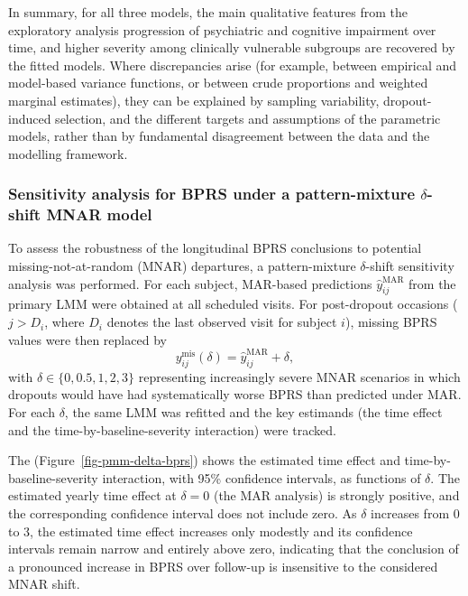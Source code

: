 \documentclass[
  9pt,
  letterpaper,
  DIV=11,
  numbers=noendperiod]{scrartcl}
\begin{document}
In summary, for all three models, the main qualitative features from the
exploratory analysis progression of psychiatric and cognitive impairment
over time, and higher severity among clinically vulnerable subgroups are
recovered by the fitted models. Where discrepancies arise (for example,
between empirical and model-based variance functions, or between crude
proportions and weighted marginal estimates), they can be explained by
sampling variability, dropout-induced selection, and the different
targets and assumptions of the parametric models, rather than by
fundamental disagreement between the data and the modelling framework.

\subsubsection{\texorpdfstring{Sensitivity analysis for BPRS under a
pattern-mixture \(\delta\)-shift MNAR
model}{Sensitivity analysis for BPRS under a pattern-mixture \textbackslash delta-shift MNAR model}}\label{sensitivity-analysis-for-bprs-under-a-pattern-mixture-delta-shift-mnar-model}

To assess the robustness of the longitudinal BPRS conclusions to
potential missing-not-at-random (MNAR) departures, a pattern-mixture
\(\delta\)-shift sensitivity analysis was performed. For each subject,
MAR-based predictions \(\widehat{y}^{\text{MAR}}_{ij}\) from the primary
LMM were obtained at all scheduled visits. For post-dropout occasions
(\(j > D_i\), where \(D_i\) denotes the last observed visit for subject
\(i\)), missing BPRS values were then replaced by \[
y^{\text{mis}}_{ij}(\delta) = \widehat{y}^{\text{MAR}}_{ij} + \delta,
\] with \(\delta \in \{0, 0.5, 1, 2, 3\}\) representing increasingly
severe MNAR scenarios in which dropouts would have had systematically
worse BPRS than predicted under MAR. For each \(\delta\), the same LMM
was refitted and the key estimands (the time effect and the
time-by-baseline-severity interaction) were tracked.

The (Figure~\ref{fig-pmm-delta-bprs}) shows the estimated time effect
and time-by-baseline-severity interaction, with 95\% confidence
intervals, as functions of \(\delta\). The estimated yearly time effect
at \(\delta = 0\) (the MAR analysis) is strongly positive, and the
corresponding confidence interval does not include zero. As \(\delta\)
increases from 0 to 3, the estimated time effect increases only modestly
and its confidence intervals remain narrow and entirely above zero,
indicating that the conclusion of a pronounced increase in BPRS over
follow-up is insensitive to the considered MNAR shift.
\end{document}
